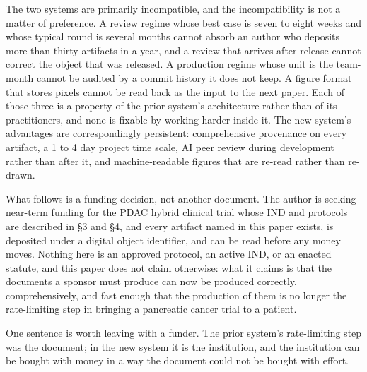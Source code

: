 The two systems are primarily incompatible, and the incompatibility is not a
matter of preference. A review regime whose best case is seven to eight weeks
and whose typical round is several months cannot absorb an author who deposits
more than thirty artifacts in a year, and a review that arrives after release
cannot correct the object that was released. A production regime whose unit is
the team-month cannot be audited by a commit history it does not keep. A figure
format that stores pixels cannot be read back as the input to the next paper.
Each of those three is a property of the prior system's architecture rather than
of its practitioners, and none is fixable by working harder inside it. The new
system's advantages are correspondingly persistent: comprehensive provenance on
every artifact, a 1 to 4 day project time scale, AI peer review during
development rather than after it, and machine-readable figures that are re-read
rather than re-drawn.

What follows is a funding decision, not another document. The author is seeking
near-term funding for the PDAC hybrid clinical trial whose IND and protocols are
described in \S3 and \S4, and every artifact named in this paper exists, is
deposited under a digital object identifier, and can be read before any money
moves. Nothing here is an approved protocol, an active IND, or an enacted
statute, and this paper does not claim otherwise: what it claims is that the
documents a sponsor must produce can now be produced correctly, comprehensively,
and fast enough that the production of them is no longer the rate-limiting step
in bringing a pancreatic cancer trial to a patient.

One sentence is worth leaving with a funder. The prior system's rate-limiting
step was the document; in the new system it is the institution, and the
institution can be bought with money in a way the document could not be bought
with effort.
